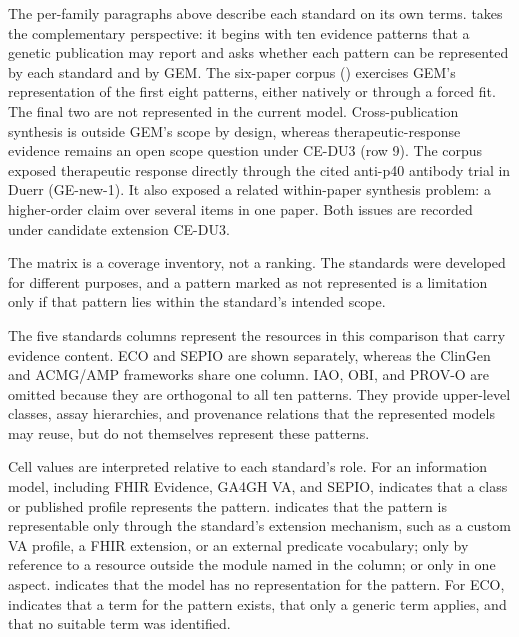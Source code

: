The per-family paragraphs above describe each standard on its own terms.
 takes the complementary perspective: it begins
with ten evidence patterns that a genetic publication may report and asks
whether each pattern can be represented by each standard and by GEM.
The six-paper corpus () exercises GEM's representation of
the first eight patterns, either natively or through a forced fit. The final
two are not represented in the current model. Cross-publication synthesis is
outside GEM's scope by design, whereas therapeutic-response evidence remains
an open scope question under CE-DU3 (row 9). The corpus exposed therapeutic
response directly through the cited anti-p40 antibody trial in Duerr
(GE-new-1). It also exposed a related within-paper synthesis problem: a
higher-order claim over several items in one paper. Both issues are recorded
under candidate extension CE-DU3.

The matrix is a coverage inventory, not a ranking. The standards were
developed for different purposes, and a pattern marked as not represented is
a limitation only if that pattern lies within the standard's intended scope.

The five standards columns represent the resources in this comparison that
carry evidence content. ECO and SEPIO are shown separately, whereas the
ClinGen and ACMG/AMP frameworks share one column. IAO, OBI, and PROV-O are
omitted because they are orthogonal to all ten patterns. They provide
upper-level classes, assay hierarchies, and provenance relations that the
represented models may reuse, but do not themselves represent these patterns.

Cell values are interpreted relative to each standard's role. For an
information model, including FHIR Evidence, GA4GH VA, and SEPIO,
\cfull{} indicates that a class or published profile represents the
pattern. \chalf{} indicates that the pattern is representable only through
the standard's extension mechanism, such as a custom VA profile, a FHIR
extension, or an external predicate vocabulary; only by reference to a
resource outside the module named in the column; or only in one aspect.
\cnone{} indicates that the model has no representation for the pattern.
For ECO, \cfull{} indicates that a term for the pattern exists, \chalf{}
that only a generic term applies, and \cnone{} that no suitable term was
identified.


